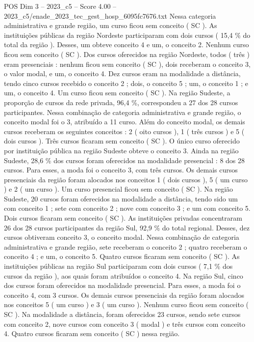 \begin{textsample}{POS Dim 3 – 2023\_c5 – Score 4.00 – 2023\_c5/enade\_2023\_tec\_gest\_hosp\_6095fc7676.txt}
Nessa categoria administrativa e grande região, um curso ficou sem conceito ( SC ).
As instituições públicas da região Nordeste participaram com dois cursos ( 15,4 \% do total da região ).
Desses, um obteve conceito 4 e um, o conceito 2.
Nenhum curso ficou sem conceito ( SC ).
Dos cursos oferecidos na região Nordeste, todos ( três ) eram presenciais : nenhum ficou sem conceito ( SC ), dois receberam o conceito 3, o valor modal, e um, o conceito 4.
Dez cursos eram na modalidade a distância, tendo cinco cursos recebido o conceito 2 ; dois, o conceito 5 ; um, o conceito 1 ; e um, o conceito 4.
Um curso ficou sem conceito ( SC ).
Na região Sudeste, a proporção de cursos da rede privada, 96,4 \%, correspondeu a 27 dos 28 cursos participantes.
Nessa combinação de categoria administrativa e grande região, o conceito modal foi o 3, atribuído a 11 curso.
Além do conceito modal, os demais cursos receberam os seguintes conceitos : 2 ( oito cursos ), 1 ( três cursos ) e 5 ( dois cursos ).
Três cursos ficaram sem conceito ( SC ).
O único curso oferecido por instituição pública na região Sudeste obteve o conceito 3.
Ainda na região Sudeste, 28,6 \% dos cursos foram oferecidos na modalidade presencial : 8 dos 28 cursos.
Para esses, a moda foi o conceito 3, com três cursos.
Os demais cursos presenciais da região foram alocados nos conceitos 1 ( dois cursos ), 5 ( um curso ) e 2 ( um curso ).
Um curso presencial ficou sem conceito ( SC ).
Na região Sudeste, 20 cursos foram oferecidos na modalidade a distância, tendo sido um com conceito 1 ; sete com conceito 2 ; nove com conceito 3 ; e um com conceito 5.
Dois cursos ficaram sem conceito ( SC ).
As instituições privadas concentraram 26 dos 28 cursos participantes da região Sul, 92,9 \% do total regional.
Desses, dez cursos obtiveram conceito 3, o conceito modal.
Nessa combinação de categoria administrativa e grande região, sete receberam o conceito 2 ; quatro receberam o conceito 4 ; e um, o conceito 5.
Quatro cursos ficaram sem conceito ( SC ).
As instituições públicas na região Sul participaram com dois cursos ( 7,1 \% dos cursos da região ), aos quais foram atribuídos o conceito 4.
Na região Sul, cinco dos cursos foram oferecidos na modalidade presencial.
Para esses, a moda foi o conceito 4, com 3 cursos.
Os demais cursos presenciais da região foram alocados nos conceitos 5 ( um curso ) e 3 ( um curso ).
Nenhum curso ficou sem conceito ( SC ).
Na modalidade a distância, foram oferecidos 23 cursos, sendo sete cursos com conceito 2, nove cursos com conceito 3 ( modal ) e três cursos com conceito 4.
Quatro cursos ficaram sem conceito ( SC ) nessa região.

\end{textsample}
